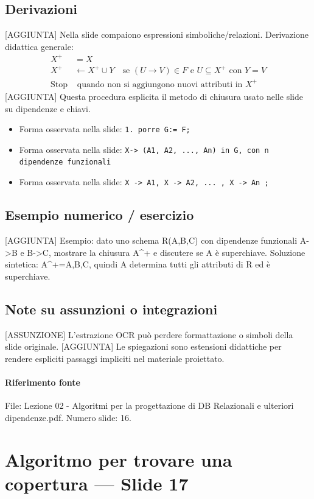 \documentclass[11pt]{article}
\begin{document}
\subsection*{Derivazioni}
[AGGIUNTA] Nella slide compaiono espressioni simboliche/relazioni. Derivazione didattica generale:
\begin{align*}
X^+ &= X \\
X^+ &\leftarrow X^+ \cup Y \quad \text{se } (U \to V) \in F \text{ e } U \subseteq X^+ \text{ con } Y=V \\
\text{Stop} &\text{ quando non si aggiungono nuovi attributi in } X^+
\end{align*}
[AGGIUNTA] Questa procedura esplicita il metodo di chiusura usato nelle slide su dipendenze e chiavi.
\begin{itemize}[leftmargin=*]
\item Forma osservata nella slide: \texttt{1.   porre G:= F;}
\item Forma osservata nella slide: \texttt{X-> (A1, A2, ..., An) in G, con n dipendenze funzionali}
\item Forma osservata nella slide: \texttt{X -> A1, X -> A2, ... , X -> An ;}
\end{itemize}
\subsection*{Esempio numerico / esercizio}
[AGGIUNTA] Esempio: dato uno schema R(A,B,C) con dipendenze funzionali A->B e B->C, mostrare la chiusura A^+ e discutere se A è superchiave. Soluzione sintetica: A^+={A,B,C}, quindi A determina tutti gli attributi di R ed è superchiave.
\subsection*{Note su assunzioni o integrazioni}
[ASSUNZIONE] L'estrazione OCR può perdere formattazione o simboli della slide originale.
[AGGIUNTA] Le spiegazioni sono estensioni didattiche per rendere espliciti passaggi impliciti nel materiale proiettato.
\paragraph{Riferimento fonte} File: Lezione 02 - Algoritmi per la progettazione di DB Relazionali e ulteriori dipendenze.pdf. Numero slide: 16.
\section{Algoritmo per trovare una copertura --- Slide 17}
\end{document}
